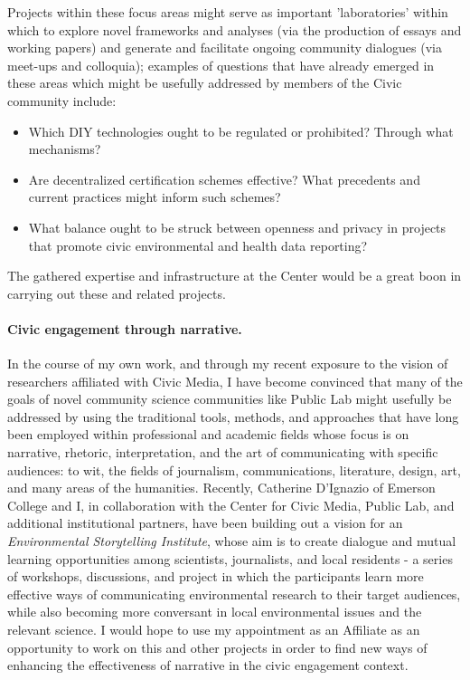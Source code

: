 \documentclass[10pt]{article}
\begin{document}
Projects within these focus areas might serve as important 'laboratories' within which to explore novel frameworks and analyses (via the production of essays and working papers) and generate and facilitate ongoing community dialogues (via meet-ups and colloquia); examples of questions that have already emerged in these areas which might be usefully addressed by members of the Civic community include:

\begin{itemize}
\item Which DIY technologies ought to be regulated or prohibited? Through what mechanisms?
\item Are decentralized certification schemes effective? What precedents and current practices might inform such schemes?
\item What balance ought to be struck between openness and privacy in projects that promote civic environmental and health data reporting? 
\end{itemize}

The gathered expertise and infrastructure at the Center would be a great boon in carrying out these and related projects. 


\paragraph{Civic engagement through narrative.} In the course of my own work, and through my recent exposure to the vision of researchers affiliated with Civic Media, I have become convinced that many of the goals of novel community science communities like Public Lab might usefully be addressed by using the traditional tools, methods, and approaches that have long been employed within professional and academic fields whose focus is on narrative, rhetoric, interpretation, and the art of communicating with specific audiences:  to wit, the fields of journalism, communications, literature, design, art, and many areas of the humanities.  Recently, Catherine D'Ignazio of Emerson College and I, in collaboration with the Center for Civic Media, Public Lab, and additional institutional partners, have been building out a vision for an \emph{Environmental Storytelling Institute}, whose aim is to create dialogue and mutual learning opportunities among scientists, journalists, and local residents - a series of workshops, discussions, and project in which the participants learn more effective ways of communicating environmental research to their target audiences, while also becoming more conversant in local environmental issues and the relevant science. I would hope to use my appointment as an Affiliate as an opportunity to work on this and other projects in order to find new ways of enhancing the effectiveness of narrative in the civic engagement context. 
\end{document}
